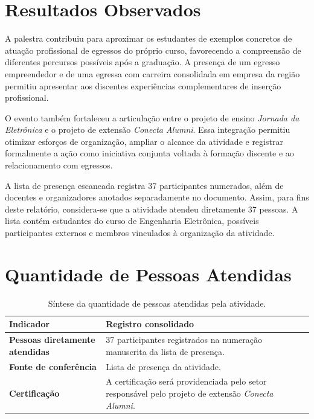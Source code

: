 \documentclass[12pt,a4paper]{article}
\begin{document}
\section{Resultados Observados}

A palestra contribuiu para aproximar os estudantes de exemplos concretos de atuação profissional de egressos do próprio curso, favorecendo a compreensão de diferentes percursos possíveis após a graduação. A presença de um egresso empreendedor e de uma egressa com carreira consolidada em empresa da região permitiu apresentar aos discentes experiências complementares de inserção profissional.

O evento também fortaleceu a articulação entre o projeto de ensino \textit{Jornada da Eletrônica} e o projeto de extensão \textit{Conecta Alumni}. Essa integração permitiu otimizar esforços de organização, ampliar o alcance da atividade e registrar formalmente a ação como iniciativa conjunta voltada à formação discente e ao relacionamento com egressos.

A lista de presença escaneada registra 37 participantes numerados, além de docentes e organizadores anotados separadamente no documento. Assim, para fins deste relatório, considera-se que a atividade atendeu diretamente 37 pessoas. A lista contém estudantes do curso de Engenharia Eletrônica, possíveis participantes externos e membros vinculados à organização da atividade.

\section{Quantidade de Pessoas Atendidas}

\begin{table}[H]
    \centering
    \begin{tabularx}{\textwidth}{>{\bfseries}p{}Y}
        \toprule
        Indicador & Registro consolidado \\
        \midrule
        Pessoas diretamente atendidas & 37 participantes registrados na numeração manuscrita da lista de presença. \\
        Fonte de conferência & Lista de presença da atividade. \\
        Certificação & A certificação será providenciada pelo setor responsável pelo projeto de extensão \textit{Conecta Alumni}. \\
        \bottomrule
    \end{tabularx}
    \caption{Síntese da quantidade de pessoas atendidas pela atividade.}
\end{table}
\end{document}
